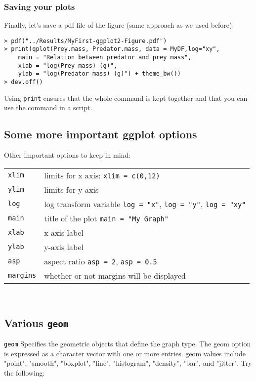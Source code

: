 \subsubsection{Saving your plots}

Finally, let's save a pdf file of the figure (same approach as we used 
before):
\begin{lstlisting}
> pdf("../Results/MyFirst-ggplot2-Figure.pdf")
> print(qplot(Prey.mass, Predator.mass, data = MyDF,log="xy",
	main = "Relation between predator and prey mass", 
	xlab = "log(Prey mass) (g)", 
	ylab = "log(Predator mass) (g)") + theme_bw())
> dev.off()
\end{lstlisting}

Using {\tt print} ensures that the whole command is kept together and 
that you can use the command in a script.

\subsection{Some more important ggplot options}
Other important options to keep in mind:

\begin{tabular}{p{1.8cm} p{11cm}} 
	{\tt xlim} & limits for x axis: {\tt xlim = c(0,12)}\\
	{\tt ylim} & limits for y axis\\
	{\tt log} & log transform variable {\tt log = "x"},
		{\tt log = "y"}, {\tt log = "xy"}\\
	{\tt main} & title of the plot {\tt main = "My Graph"}\\
	{\tt xlab} & x-axis label\\
	{\tt ylab} & y-axis label\\
	{\tt asp} & aspect ratio  {\tt asp = 2}, {\tt asp = 0.5}\\
	{\tt margins} & whether or not margins will be displayed\\
\end{tabular}\\

\subsection{Various {\tt geom}}

{\tt geom} Specifies the geometric objects that define the graph type. 
The geom option is expressed as a character vector with one or more 
entries. geom values include "point", "smooth", "boxplot", "line", 
"histogram", "density", "bar", and "jitter". Try the following:

